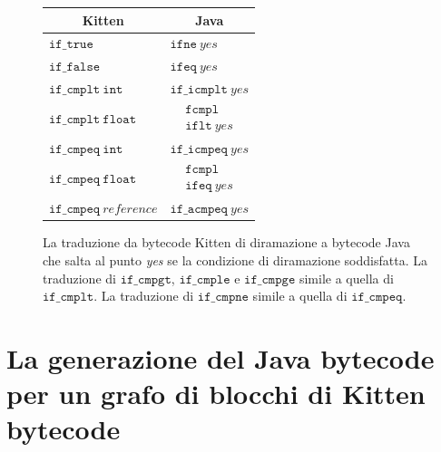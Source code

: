 \begin{figure}
\begin{center}
\begin{tabular}{l|l}
\multicolumn{1}{c}{Kitten} &
\multicolumn{1}{c}{Java} \\\hline\hline
$\mathtt{if\_true}$ & $\mathtt{ifne}\ \mathit{yes}$ \\\hline
$\mathtt{if\_false}$ & $\mathtt{ifeq}\ \mathit{yes}$ \\\hline
$\mathtt{if\_cmplt\ int}$ & $\mathtt{if\_icmplt}\ \mathit{yes}$ \\\hline
$\mathtt{if\_cmplt\ float}$ & $\begin{array}{rl}
                            & \mathtt{fcmpl} \\
                            & \mathtt{iflt}\ \mathit{yes}
                           \end{array}$\\\hline
$\mathtt{if\_cmpeq\ int}$ & $\mathtt{if\_icmpeq}\ \mathit{yes}$ \\\hline
$\mathtt{if\_cmpeq\ float}$ & $\begin{array}{rl}
                            & \mathtt{fcmpl} \\
                            & \mathtt{ifeq}\ \mathit{yes}
                           \end{array}$\\\hline
$\mathtt{if\_cmpeq}\ \mathit{reference}$ & $\mathtt{if\_acmpeq}\ \mathit{yes}$ \\\hline
\end{tabular}
\end{center}
\caption{La traduzione da bytecode Kitten di diramazione a bytecode Java che salta
al punto \textit{yes} se la condizione di diramazione \e soddisfatta.
La traduzione di $\mathtt{if\_cmpgt}$, $\mathtt{if\_cmple}$ e $\mathtt{if\_cmpge}$
\e simile a quella di $\mathtt{if\_cmplt}$. La traduzione di
$\mathtt{if\_cmpne}$ \e simile a quella di $\mathtt{if\_cmpeq}$.}
  \label{fig:kitten_into_java_condition}
\end{figure}

\section{La generazione del Java bytecode per un grafo di blocchi di Kitten bytecode}
